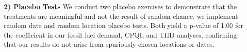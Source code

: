 \documentclass[a4paper,fleqn,longmktitle]{cas-sc}
\newcommand{\nb}[1]{\textcolor{blue}{NB[#1]}}
\theoremstyle{plain}
\theoremstyle{definition}
\begin{document}
\noindent\textbf{2) Placebo Tests}
We conduct two placebo exercises to demonstrate that the treatments are meaningful and not the result of random chance, we implement random date and random location placebo tests. Both yield a p-value of 1.00 for the coefficient in our fossil fuel demand, CPQI, and THD analyses, confirming that our results do not arise from spuriously chosen locations or dates.







\end{document}
